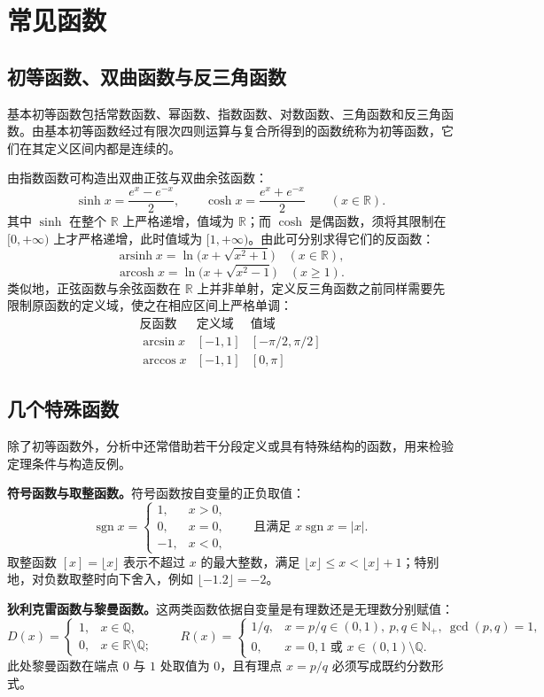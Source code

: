 \documentclass[UTF8, fontset=fandol, a4paper, 12pt]{ctexart}
\newcommand{\R}{\mathbb R}
\newcommand{\Q}{\mathbb Q}
\newcommand{\Nplus}{\mathbb N_{+}}
\DeclareMathOperator{\arsinh}{arsinh}
\DeclareMathOperator{\arcosh}{arcosh}
\DeclareMathOperator{\sgn}{sgn}
\theoremstyle{definition}
\begin{document}
\newpage
\section{常见函数}
\subsection{初等函数、双曲函数与反三角函数}
基本初等函数包括常数函数、幂函数、指数函数、对数函数、三角函数和反三角函数。由基本初等函数经过有限次四则运算与复合所得到的函数统称为初等函数，它们在其定义区间内都是连续的。

由指数函数可构造出双曲正弦与双曲余弦函数：
\[
 \sinh x=\frac{e^x-e^{-x}}2,\qquad
 \cosh x=\frac{e^x+e^{-x}}2\qquad(x\in\R).
\]
其中 $\sinh$ 在整个 $\R$ 上严格递增，值域为 $\R$；而 $\cosh$ 是偶函数，须将其限制在 $[0,+\infty)$ 上才严格递增，此时值域为 $[1,+\infty)$。由此可分别求得它们的反函数：
\[
 \arsinh x=\ln\bigl(x+\sqrt{x^2+1}\bigr)\quad(x\in\R),
\]
\[
 \arcosh x=\ln\bigl(x+\sqrt{x^2-1}\bigr)\quad(x\ge1).
\]
类似地，正弦函数与余弦函数在 $\R$ 上并非单射，定义反三角函数之前同样需要先限制原函数的定义域，使之在相应区间上严格单调：
\[
\begin{array}{c|c|c}
 \text{反函数}&\text{定义域}&\text{值域}\\ \hline
 \arcsin x&[-1,1]&[-\pi/2,\pi/2]\\
 \arccos x&[-1,1]&[0,\pi]
\end{array}
\]

\subsection{几个特殊函数}
除了初等函数外，分析中还常借助若干分段定义或具有特殊结构的函数，用来检验定理条件与构造反例。

\textbf{符号函数与取整函数。}符号函数按自变量的正负取值：
\[
 \sgn x=\begin{cases}1,&x>0,\\0,&x=0,\\-1,&x<0,\end{cases}
 \qquad \text{且满足 } x\sgn x=|x|.
\]
取整函数 $[x]=\lfloor x\rfloor$ 表示不超过 $x$ 的最大整数，满足 $\lfloor x\rfloor\le x<\lfloor x\rfloor+1$；特别地，对负数取整时向下舍入，例如 $\lfloor-1.2\rfloor=-2$。

\textbf{狄利克雷函数与黎曼函数。}这两类函数依据自变量是有理数还是无理数分别赋值：
\[
 D(x)=\begin{cases}1,&x\in\Q,\\0,&x\in\R\setminus\Q;\end{cases}
 \qquad
 R(x)=\begin{cases}
 1/q,&x=p/q\in(0,1),\ p,q\in\Nplus,\ \gcd(p,q)=1,\\
 0,&x=0,1\text{ 或 }x\in(0,1)\setminus\Q.
 \end{cases}
\]
此处黎曼函数在端点 $0$ 与 $1$ 处取值为 $0$，且有理点 $x=p/q$ 必须写成既约分数形式。
\end{document}
